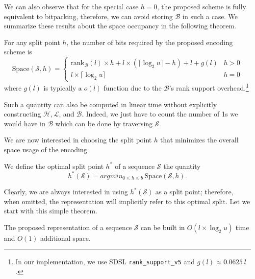 We can also observe that for the special case $h= 0$, the proposed scheme is fully equivalent to bitpacking, therefore, we can avoid storing $\mathcal B$ in such a case. We summarize these results about the space occupancy in the following theorem.
\begin{theorem}\label{thm:space}
    For any split point $h$, the number of bits required by the proposed encoding scheme is
\begin{equation*}
    \mathrm{Space}(\mathcal S, h) = \begin{cases}
        \mathrm{rank}_{\mathcal B}(l) \times h + l \times (\lceil \log_2 u \rceil - h) + l + g(l) & h > 0 \\
        l \times \lceil \log_2 u \rceil  & h = 0
    \end{cases}
\end{equation*}
where $g(l)$ is typically a $o(l)$ function due to the $\mathcal B$'s rank support overhead.\footnote{In our implementation, we use  SDSL \texttt{rank\_support\_v5} and $g(l) \approx 0.0625\: l$.}
\end{theorem}

Such a quantity can also be computed in linear time without explicitly constructing $\mathcal H, \mathcal L$, and $\mathcal B$. Indeed,  we just have to count the number of 1s we would have in $\mathcal B$ which can be done by traversing $\mathcal S$.

We are now interested in choosing the split point $ h $ that minimizes the overall space usage of the encoding.
\begin{definition}
    We define the optimal split point $h^*$ of a sequence $\mathcal{S}$ the quantity
\begin{equation*}
    h^*(\mathcal S) = argmin_{0 \le h \le b} \ \mathrm{Space}(\mathcal S,  h).
\end{equation*}
\end{definition}

Clearly, we are always interested in using $ h^*(\mathcal{S}) $ as a split point; therefore, when omitted, the representation will implicitly refer to this optimal split. Let we start with this simple theorem.

\begin{theorem}
The proposed representation of a sequence $\mathcal S$ can be built in $O(l \times \log_2 u)$ time and $O(1)$ additional space.
\end{theorem}

